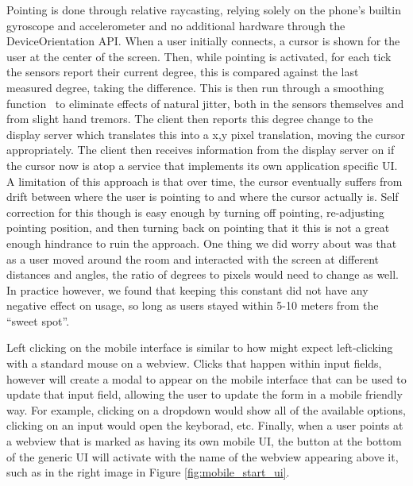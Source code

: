 Pointing is done through relative raycasting, relying solely
on the phone's builtin gyroscope and accelerometer and no additional
hardware through the DeviceOrientation API. When a user initially
connects, a
cursor is shown for the user at the center of the screen. Then,
while pointing is activated, for each tick the sensors report
their current degree, this is compared against the last measured
degree, taking the difference. This is then run through a smoothing
function~\cite{casiez_1_2012} to eliminate effects of natural
jitter, both in the sensors themselves and from slight hand
tremors. The client then reports this degree change to the display
server which translates this into a x,y pixel translation,
moving the cursor appropriately. The client then receives
information from the display server on if the cursor now is atop
a service that implements its own application specific UI. A
limitation of this approach is that over time, the cursor
eventually suffers from drift between where the user is pointing
to and where the cursor actually is. Self correction for this
though is easy enough by turning off pointing, re-adjusting
pointing position, and then turning back on pointing that it
this is not a great enough hindrance to ruin the approach. One thing
we did worry about was that as a user moved around the room and
interacted with the screen at different distances and angles, the
ratio of
degrees to pixels would need to change as well. In practice however,
we found that keeping this constant did not have any negative
effect on usage, so long as users stayed within 5-10 meters from
the ``sweet spot''.

Left clicking on the mobile interface is similar to how might
expect left-clicking with a standard mouse on a webview. Clicks that
happen within input fields, however will create a modal to appear
on the mobile interface that can be used to update that input
field, allowing the user to update the form in a mobile friendly
way. For example, clicking on a dropdown would show all of
the available options, clicking on an input would open the
keyborad, etc. Finally, when a user points at a webview that
is marked as having its own mobile UI, the button at the bottom
of the generic UI will activate with the name of the webview
appearing above it, such as in the right image in Figure
\ref{fig:mobile_start_ui}.

